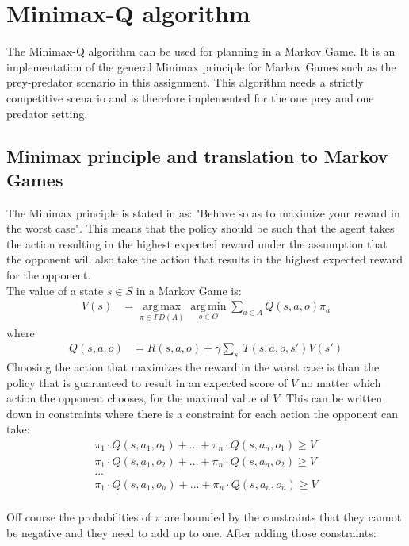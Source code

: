
\section{Minimax-Q algorithm}
The Minimax-Q algorithm can be used for planning in a Markov Game. It is an implementation of the general Minimax principle for Markov Games such as the prey-predator scenario in this assignment. This algorithm needs a strictly competitive scenario and is therefore implemented for the one prey and one predator setting. 

\subsection{Minimax principle and translation to Markov Games}
The Minimax principle is stated in \cite{minimax} as: "Behave so as to maximize your reward in the worst case". This means that the policy should be such that the agent takes the action resulting in the highest expected reward under the assumption that the opponent will also take the action that results in the highest expected reward for the opponent.  \\
 
The value of a state $s\in S$ in a Markov Game is:
\begin{align*}
V(s) &= \operatorname*{arg\,max}_{\pi \in PD(A)}
\operatorname*{arg\,min}_{o \in O}
\sum_{a \in A} Q(s,a,o) \pi_a
\end{align*}
where
\begin{align*}
Q(s,a,o) &= R(s,a,o) + \gamma \sum_{s'} T(s,a,o,s')V(s')
\end{align*}
Choosing the action that maximizes the reward in the worst case is than the policy that is guaranteed to result in an expected score of $V$ no matter which action the opponent chooses, for the maximal value of $V$. This can be written down in constraints where there is a constraint for each action the opponent can take:
%  
\begin{align*}
\pi_1 \cdot Q(s,a_1,o_1)+ ... + \pi_n \cdot Q(s,a_n,o_1) \geq V\\
\pi_1 \cdot Q(s,a_1,o_2)+ ... + \pi_n \cdot Q(s,a_n,o_2) \geq V\\
...\\
\pi_1 \cdot Q(s,a_1,o_n)+ ... + \pi_n \cdot Q(s,a_n,o_n) \geq V\\
\end{align*}

Off course the probabilities of $\pi$ are bounded by the constraints that they cannot be negative and they need to add up to one. After adding those constraints:

